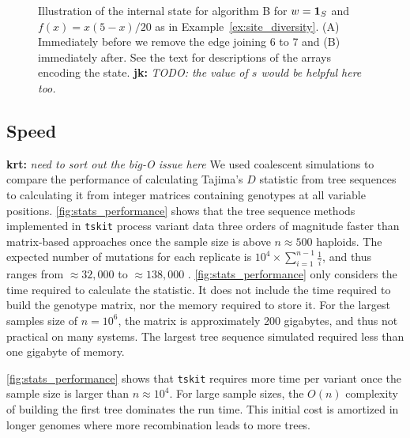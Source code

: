 \documentclass{article}
\newcommand{\iw}{w} %
\newcommand{\jk}[1]{{\color{red}\textbf{jk:} \it #1}}
\newcommand{\krt}[1]{{\color{green}\textbf{krt:} \it #1}}
\begin{document}
\begin{figure}
\caption{
Illustration of the internal state for algorithm B for $\iw = \bone_S$ and
$f(x) = x(5 - x) / 20$ as in Example~\ref{ex:site_diversity}. (A)
Immediately before we remove the edge joining 6 to 7 and (B) immediately after.
See the text for descriptions of the arrays encoding the state.
\jk{TODO: the value of $s$ would be helpful here too.}
\label{fig:algorithm_example}}
\end{figure}

\subsection*{Speed}

\krt{need to sort out the big-O issue here}
We used coalescent simulations to compare the performance of calculating Tajima's \citeyearpar{Tajima1989-de} $D$
statistic from tree sequences to calculating it from integer matrices containing genotypes at all variable positions.
\autoref{fig:stats_performance} shows that the tree sequence methods implemented in \texttt{tskit} process variant data
three orders of magnitude faster than matrix-based approaches once the sample size is above $n \approx 500$ haploids.
The expected number of mutations for each replicate is $10^4 \times \sum_{i=1}^{n-1}\frac{1}{i}$, and thus ranges from
$\approx 32,000$ to $\approx 138,000$ \citep{Watterson1975-ej}.
\autoref{fig:stats_performance} only considers the time required to calculate the statistic. It does not include the time
required to build the genotype matrix, nor the memory required to store it.  For the largest samples size of $n=10^6$,
the matrix is approximately 200 gigabytes, and thus not practical on many systems.  The largest tree sequence simulated
required less than one gigabyte of memory.

\autoref{fig:stats_performance} shows that \texttt{tskit} requires more time per variant once the sample size is larger
than $n \approx 10^4$.  For large sample sizes, the $O(n)$ complexity of building the first tree dominates the run time.
This initial cost is amortized in longer genomes where more recombination leads to more trees.
\end{document}
